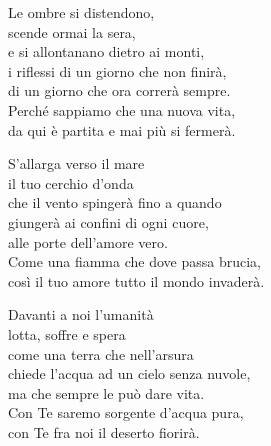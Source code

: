 
\strofa Le ombre si distendono,\\
scende ormai la sera,\\
e si allontanano dietro ai monti,\\
i riflessi di un giorno che non finirà,\\
di un giorno che ora correrà sempre.\\
Perché sappiamo che una nuova vita,\\
da qui è partita e mai più si fermerà.

\spazio


\spazio

\strofa S'allarga verso il mare\\
il tuo cerchio d'onda\\
che il vento spingerà fino a quando\\
giungerà ai confini di ogni cuore,\\
alle porte dell'amore vero.\\
Come una fiamma che dove passa brucia,\\
così il tuo amore tutto il mondo invaderà.

\spazio


\spazio

\strofa Davanti a noi l'umanità\\
lotta, soffre e spera\\
come una terra che nell'arsura\\
chiede l'acqua ad un cielo senza nuvole,\\
ma che sempre le può dare vita.\\
Con Te saremo sorgente d'acqua pura,\\
con Te fra noi il deserto fiorirà.

\spazio

